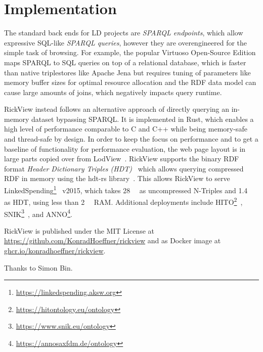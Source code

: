\documentclass{ceurart}
\begin{document}
\section{Implementation}\label{implementation}

The standard back ends for LD projects are \emph{SPARQL endpoints}, which allow expressive SQL-like \emph{SPARQL queries}, however they are overengineered for the simple task of browsing.
For example, the popular Virtuoso Open-Source Edition maps SPARQL to SQL queries on top of a relational database, which is faster than native triplestores like Apache Jena but requires tuning of parameters like memory buffer sizes for optimal resource allocation and the RDF data model can cause large amounts of joins, which negatively impacts query runtime.

RickView instead follows an alternative approach of directly querying an in-memory dataset bypassing SPARQL.
It is implemented in Rust, which enables a high level of performance comparable to C and C++ while being memory-safe and thread-safe by design.
In order to keep the focus on performance and to get a baseline of functionality for performance evaluation, the web page layout is in large parts copied
over from LodView~\citep{lodview,adaptinglodview}.
%
		RickView supports the binary RDF format \emph{Header Dictionary Triples (HDT)}~\citep{hdt2012} which allows querying compressed RDF in memory using the hdt-rs library~\citep{hdtrs}.
		This allows RickView to serve LinkedSpending\footnote{\url{https://linkedspending.aksw.org}}~\citep{linkedspending} v2015, which takes \SI{28}{\giga\byte} as uncompressed N-Triples and \SI{1.4}{\giga\byte} as HDT, using less than \SI{2}{\giga\byte} RAM.
		Additional deployments include HITO\footnote{\url{https://hitontology.eu/ontology}}~\citep{hito}, SNIK\footnote{\url{https://www.snik.eu/ontology}}~\citep{snik},
		 and ANNO\footnote{\url{https://annosaxfdm.de/ontology}}.

		RickView is published under the MIT License at \url{https://github.com/KonradHoeffner/rickview} and as Docker image at \url{ghcr.io/konradhoeffner/rickview}.

		\begin{acknowledgments}
		Thanks to Simon Bin.
		\end{acknowledgments}
		
\end{document}
